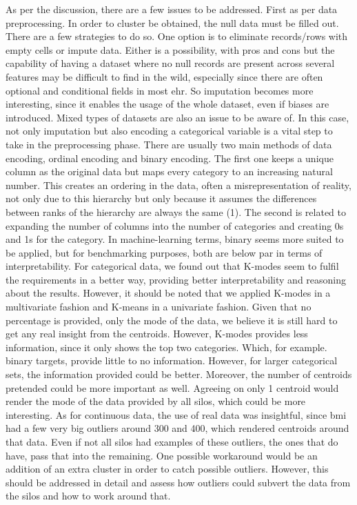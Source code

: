 As per the discussion, there are a few issues to be addressed. First as per data preprocessing. In order to cluster be obtained, the null data must be filled out. There are a few strategies to do so. One option is to eliminate records/rows with empty cells or impute data. Either is a possibility, with pros and cons but the capability of having a dataset where no null records are present across several features may be difficult to find in the wild, especially since there are often optional and conditional fields in most \ac{ehr}. So imputation becomes more interesting, since it enables the usage of the whole dataset, even if biases are introduced.
Mixed types of datasets are also an issue to be aware of. In this case, not only imputation but also encoding a categorical variable is a vital step to take in the preprocessing phase. There are usually two main methods of data encoding, ordinal encoding and binary encoding. The first one keeps a unique column as the original data but maps every category to an increasing natural number. This creates an ordering in the data, often a misrepresentation of reality, not only due to this hierarchy but only because it assumes the differences between ranks of the hierarchy are always the same (1). The second is related to expanding the number of columns into the number of categories and creating 0s and 1s for the category. In machine-learning terms, binary seems more suited to be applied, but for benchmarking purposes, both are below par in terms of interpretability. For categorical data, we found out that K-modes seem to fulfil the requirements in a better way, providing better interpretability and reasoning about the results. However, it should be noted that we applied K-modes in a multivariate fashion and K-means in a univariate fashion.
Given that no percentage is provided, only the mode of the data, we believe it is still hard to get any real insight from the centroids. However, K-modes provides less information, since it only shows the top two categories. Which, for example. binary targets, provide little to no information. However, for larger categorical sets, the information provided could be better. Moreover, the number of centroids pretended could be more important as well. Agreeing on only 1 centroid would render the mode of the data provided by all silos, which could be more interesting.
As for continuous data, the use of real data was insightful, since \ac{bmi} had a few very big outliers around 300 and 400, which rendered centroids around that data. Even if not all silos had examples of these outliers, the ones that do have, pass that into the remaining. One possible workaround would be an addition of an extra cluster in order to catch possible outliers.
However, this should be addressed in detail and assess how outliers could subvert the data from the silos and how to work around that.

